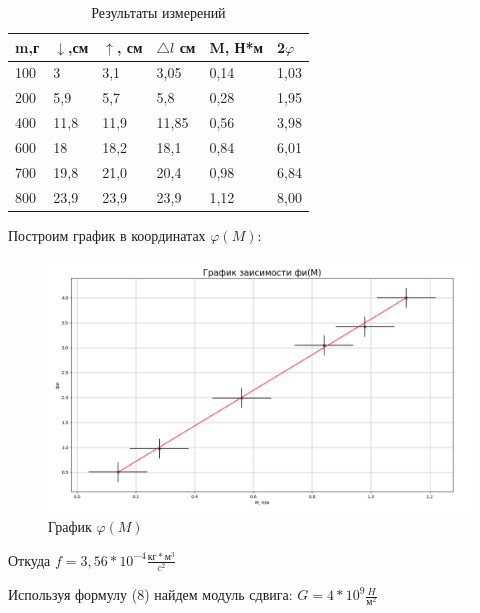 \documentclass[a4paper]{article}
\begin{document}
\begin{table}[!h]
    \begin{center}
    \begin{tabular}{|l|l|l|l|l|l|}
    \hline
    m,г &$\downarrow $,см& $\uparrow $, см& $\bigtriangleup l$ см& M, Н*м& 2$\varphi $ \\ \hline
    100& 3& 3,1& 3,05& 0,14& 1,03 \\ \hline
    200& 5,9& 5,7& 5,8& 0,28& 1,95 \\ \hline
    400& 11,8& 11,9& 11,85& 0,56& 3,98 \\ \hline
    600& 18& 18,2& 18,1& 0,84& 6,01 \\ \hline
    700& 19,8& 21,0& 20,4& 0,98& 6,84 \\ \hline
    800& 23,9& 23,9& 23,9& 1,12& 8,00 \\ \hline
\end{tabular}
\caption{Результаты измерений}
\end{center}
\end{table}

Построим график в координатах $\varphi (M)$:
\begin{figure}[h]
    \centering
    \includegraphics[width=1\textwidth]{pick3.PNG} 
    \caption{График $\varphi(M)$}
    \end{figure}
Откуда $f= 3,56*10^{-4} \frac{\text{кг}*\text{м}^{3}}{c^{2}}$\par
Используя формулу (8) найдем модуль сдвига: $G = 4*10^{9} \frac{H}{\text{м}^{2}} $
\end{document}
